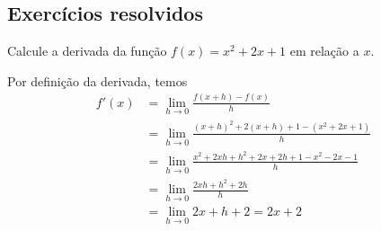 \cleardoublepage\documentclass[../main.tex]{subfiles}
\begin{document}
\subsection{Exercícios resolvidos}

\begin{exeresol}
  Calcule a derivada da função $f(x) = x^2 + 2x + 1$ em relação a $x$.
\end{exeresol}
\begin{resol}
  Por definição da derivada, temos
  \begin{align*}
    f'(x) &= \lim_{h\to 0} \frac{f(x+h)-f(x)}{h}\\
          &= \lim_{h\to 0} \frac{(x+h)^2 + 2(x+h) + 1 - (x^2+2x+1)}{h}\\
          &= \lim_{h\to 0} \frac{x^2+2xh+h^2+2x+2h+1-x^2-2x-1}{h}\\
          &= \lim_{h\to 0} \frac{2xh+h^2+2h}{h}\\
          &= \lim_{h\to 0} 2x+h+2 = 2x+2
  \end{align*}
\end{resol}
\end{document}
